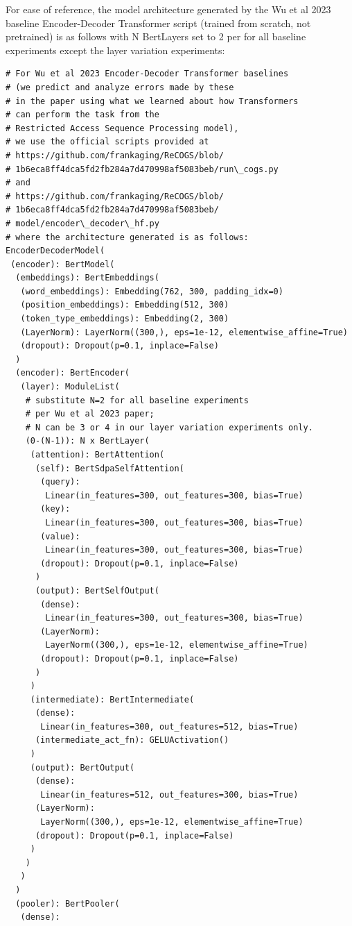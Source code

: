 \documentclass[11pt]{article}
\begin{document}
For ease of reference, the model architecture generated by the Wu et al 2023 baseline Encoder-Decoder Transformer script (trained from scratch, not pretrained) is as follows with N BertLayers set to 2 per \cite{Wu2023} for all baseline experiments except the layer variation experiments:
\begin{tiny}
\begin{verbatim}
# For Wu et al 2023 Encoder-Decoder Transformer baselines 
# (we predict and analyze errors made by these 
# in the paper using what we learned about how Transformers 
# can perform the task from the 
# Restricted Access Sequence Processing model),
# we use the official scripts provided at 
# https://github.com/frankaging/ReCOGS/blob/
# 1b6eca8ff4dca5fd2fb284a7d470998af5083beb/run\_cogs.py
# and 
# https://github.com/frankaging/ReCOGS/blob/
# 1b6eca8ff4dca5fd2fb284a7d470998af5083beb/
# model/encoder\_decoder\_hf.py
# where the architecture generated is as follows:
EncoderDecoderModel(
 (encoder): BertModel(
  (embeddings): BertEmbeddings(
   (word_embeddings): Embedding(762, 300, padding_idx=0)
   (position_embeddings): Embedding(512, 300)
   (token_type_embeddings): Embedding(2, 300)
   (LayerNorm): LayerNorm((300,), eps=1e-12, elementwise_affine=True)
   (dropout): Dropout(p=0.1, inplace=False)
  )
  (encoder): BertEncoder(
   (layer): ModuleList(
    # substitute N=2 for all baseline experiments
    # per Wu et al 2023 paper; 
    # N can be 3 or 4 in our layer variation experiments only.
    (0-(N-1)): N x BertLayer(
     (attention): BertAttention(
      (self): BertSdpaSelfAttention(
       (query): 
        Linear(in_features=300, out_features=300, bias=True)
       (key): 
        Linear(in_features=300, out_features=300, bias=True)
       (value): 
        Linear(in_features=300, out_features=300, bias=True)
       (dropout): Dropout(p=0.1, inplace=False)
      )
      (output): BertSelfOutput(
       (dense): 
        Linear(in_features=300, out_features=300, bias=True)
       (LayerNorm): 
        LayerNorm((300,), eps=1e-12, elementwise_affine=True)
       (dropout): Dropout(p=0.1, inplace=False)
      )
     )
     (intermediate): BertIntermediate(
      (dense): 
       Linear(in_features=300, out_features=512, bias=True)
      (intermediate_act_fn): GELUActivation()
     )
     (output): BertOutput(
      (dense): 
       Linear(in_features=512, out_features=300, bias=True)
      (LayerNorm): 
       LayerNorm((300,), eps=1e-12, elementwise_affine=True)
      (dropout): Dropout(p=0.1, inplace=False)
     )
    )
   )
  )
  (pooler): BertPooler(
   (dense): 

\end{verbatim}
\end{tiny}
\end{document}
